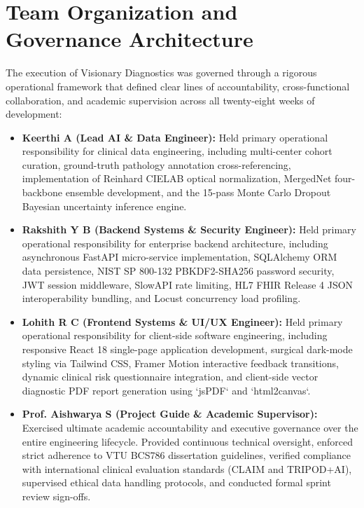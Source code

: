 \documentclass[12pt,a4paper,oneside]{report}
\begin{document}
\section{Team Organization and Governance Architecture}
\label{sec:raci_matrix}

The execution of Visionary Diagnostics was governed through a rigorous operational framework that defined clear lines of accountability, cross-functional collaboration, and academic supervision across all twenty-eight weeks of development:

\begin{itemize}[leftmargin=*]
    \item \textbf{Keerthi A (Lead AI \& Data Engineer):} Held primary operational responsibility for clinical data engineering, including multi-center cohort curation, ground-truth pathology annotation cross-referencing, implementation of Reinhard CIELAB optical normalization, MergedNet four-backbone ensemble development, and the 15-pass Monte Carlo Dropout Bayesian uncertainty inference engine.
    
    \item \textbf{Rakshith Y B (Backend Systems \& Security Engineer):} Held primary operational responsibility for enterprise backend architecture, including asynchronous FastAPI micro-service implementation, SQLAlchemy ORM data persistence, NIST SP 800-132 PBKDF2-SHA256 password security, JWT session middleware, SlowAPI rate limiting, HL7 FHIR Release 4 JSON interoperability bundling, and Locust concurrency load profiling.
    
    \item \textbf{Lohith R C (Frontend Systems \& UI/UX Engineer):} Held primary operational responsibility for client-side software engineering, including responsive React 18 single-page application development, surgical dark-mode styling via Tailwind CSS, Framer Motion interactive feedback transitions, dynamic clinical risk questionnaire integration, and client-side vector diagnostic PDF report generation using `jsPDF` and `html2canvas`.
    
    \item \textbf{Prof. Aishwarya S (Project Guide \& Academic Supervisor):} Exercised ultimate academic accountability and executive governance over the entire engineering lifecycle. Provided continuous technical oversight, enforced strict adherence to VTU BCS786 dissertation guidelines, verified compliance with international clinical evaluation standards (CLAIM and TRIPOD+AI), supervised ethical data handling protocols, and conducted formal sprint review sign-offs.
\end{itemize}
\end{document}
